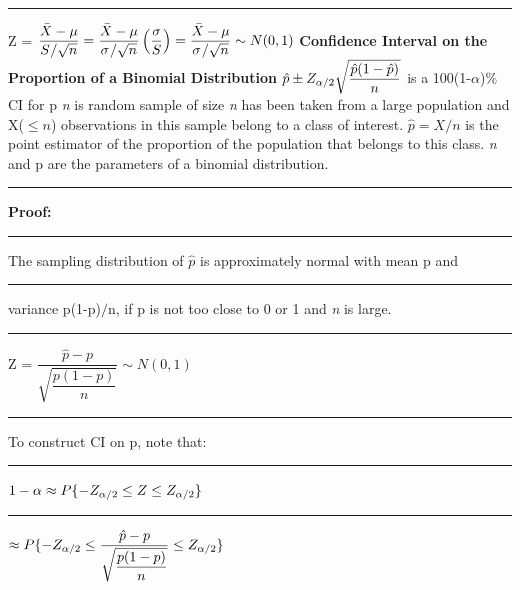 \documentclass[]{article}
\begin{document}
\newline\Large\rule{3.0cm}{0pt}  Z = $\dfrac{\bar{X} - \mu}{ S \\/ \sqrt{n} } = \dfrac{\bar{X} - \mu}{ \sigma \\/ \sqrt{n} } \left(\dfrac{\sigma}{S} \right) =  \dfrac{\bar{X} - \mu}{ \sigma \\/ \sqrt{n} } \sim N(0,1)$
\newline
\newline
\newline \Large\textbf{Confidence Interval on the Proportion of a Binomial Distribution}
\newline
\newline $\hat{p} \pm Z_{\alpha\\/2}\sqrt{\dfrac{\hat{p} (1-\hat{p} )}{n}} $ is a 100(1-$\alpha$)$\%$ CI for p 
\newline
\newline \textit{n} is random sample of size \textit{n} has been taken from a large population and X($\le n$) observations in this sample belong to a class of interest. 
\newline $\hat{p} = X/n$ is the point estimator of the proportion of the population that belongs to this class. 
\newline \textit{n} and p are the parameters of a binomial distribution.
\newline 
\newline\Large\rule{3.0cm}{0pt} \textbf{Proof:}
\newline\Large\rule{3.0cm}{0pt} The sampling distribution of $\hat{p}$ is approximately normal with mean p and 
\newline\Large\rule{3.0cm}{0pt} variance p(1-p)$/$n, if p is not too close to 0 or 1 and \textit{n} is large.
\newline
\newline\Large\rule{3.0cm}{0pt}  Z = $\dfrac{\hat{p} - p}{ \sqrt{\dfrac{p(1-p)}{n}}  } \sim N(0,1)$
\newline
\newline\Large\rule{3.0cm}{0pt} To construct CI on p, note that:
\newline
\newline\Large\rule{3.0cm}{0pt} $1 - \alpha \approx P \{ -Z_{\alpha\\/2} \le Z \le Z_{\alpha\\/2}  \}$
\newline
\newline\Large\rule{4.3cm}{0pt} $ \approx  P \{ -Z_{\alpha\\/2} \le \dfrac{\hat{p} - p}{ \sqrt{\dfrac{p(1-p)}{n}}  } \le Z_{\alpha\\/2}  \}$
\end{document}

